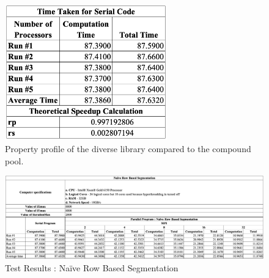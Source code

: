 \documentclass[conference]{IEEEtran}
\begin{document}
	\newpage
	\onecolumn
	\appendix
		\begin{figure}[h]
		\centering
		\includegraphics[width=7cm,keepaspectratio]{SCal}
		\caption{Property profile of the diverse library compared to the compound pool.}
		\label{fig:PropProf}
	\end{figure}
	\newpage
	\begin{figure}
		\centering
		\includegraphics[width=\textheight,height=\textwidth,keepaspectratio]{NaiveCal}
		\caption{Test Results : Naïve Row Based Segmentation}
		\label{fig:PropProf}
	\end{figure}
\newpage
\end{document}
